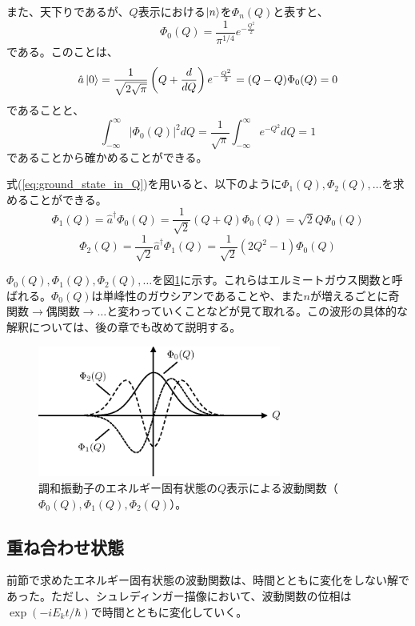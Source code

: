 また、天下りであるが、$Q$表示における$\ket n$を$\Phi_n(Q)$と表すと、
\begin{equation}
  \Phi_0(Q) = \frac{1}{\pi^{1/4}}e^{-\frac{Q^2}{2}}
  \label{eq:ground_state_in_Q}
\end{equation}
である。このことは、
\begin{equation}
  \hat a \ket 0 = \frac 1 {\sqrt {2\sqrt \pi}} \left( Q + \frac{d}{dQ} \right)e^{-\frac{Q^2}{2}} = (Q - Q)\Phi_0(Q) = 0
\end{equation}
であることと、
\begin{equation}
  \int_{-\infty}^{\infty}|\Phi_0(Q)|^2 dQ = \frac 1 {\sqrt \pi}\int_{-\infty}^\infty e^{-Q^2}dQ = 1
\end{equation}
であることから確かめることができる。

式(\ref{eq:ground_state_in_Q})を用いると、以下のように$\Phi_1(Q), \Phi_2(Q), \hdots$を求めることができる。
\begin{equation}
  \Phi_1(Q) = \hat a^\dagger \Phi_0(Q) = \frac{1}{\sqrt 2}(Q + Q)\Phi_0(Q) = \sqrt 2 Q \Phi_0(Q)
\end{equation}
\begin{equation}
  \Phi_2(Q) = \frac{1}{\sqrt 2}\hat a^\dagger \Phi_1(Q) = \frac{1}{\sqrt 2}(2Q^2 - 1)\Phi_0(Q)
\end{equation}

$\Phi_0(Q), \Phi_1(Q), \Phi_2(Q), \hdots$を図\ref{fig:Hermite_Gaussian}に示す。これらはエルミートガウス関数と呼ばれる。$\Phi_0(Q)$は単峰性のガウシアンであることや、また$n$が増えるごとに奇関数$\to$偶関数$\to \hdots$と変わっていくことなどが見て取れる。この波形の具体的な解釈については、後の章でも改めて説明する。

\begin{figure}
  \centering
  \includegraphics[width=8cm]{fig/2-2_Hermite_Gaussian.eps} 
  \caption{調和振動子のエネルギー固有状態の$Q$表示による波動関数（$\Phi_0(Q), \Phi_1(Q), \Phi_2(Q)$）。}
  \label{fig:Hermite_Gaussian}
\end{figure}

\subsection{重ね合わせ状態}
前節で求めたエネルギー固有状態の波動関数は、時間とともに変化をしない解であった。ただし、シュレディンガー描像において、波動関数の位相は$\exp(-iE_kt/\hbar)$で時間とともに変化していく。

